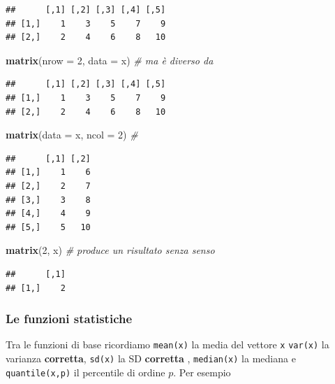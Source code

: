 \documentclass[
  11pt,
]{book}
\newenvironment{Shaded}{\begin{snugshade}}{\end{snugshade}}
\newcommand{\AttributeTok}[1]{\textcolor[rgb]{0.13,0.29,0.53}{#1}}
\newcommand{\CommentTok}[1]{\textcolor[rgb]{0.56,0.35,0.01}{\textit{#1}}}
\newcommand{\DecValTok}[1]{\textcolor[rgb]{0.00,0.00,0.81}{#1}}
\newcommand{\FunctionTok}[1]{\textcolor[rgb]{0.13,0.29,0.53}{\textbf{#1}}}
\newcommand{\NormalTok}[1]{#1}
\theoremstyle{mytheoremstyle}
\theoremstyle{mydefstyle}
\begin{document}
\begin{verbatim}
##      [,1] [,2] [,3] [,4] [,5]
## [1,]    1    3    5    7    9
## [2,]    2    4    6    8   10
\end{verbatim}

\begin{Shaded}
\begin{Highlighting}[]
\FunctionTok{matrix}\NormalTok{(}\AttributeTok{nrow =} \DecValTok{2}\NormalTok{, }\AttributeTok{data =}\NormalTok{ x)  }\CommentTok{\# ma è diverso da}
\end{Highlighting}
\end{Shaded}

\begin{verbatim}
##      [,1] [,2] [,3] [,4] [,5]
## [1,]    1    3    5    7    9
## [2,]    2    4    6    8   10
\end{verbatim}

\begin{Shaded}
\begin{Highlighting}[]
\FunctionTok{matrix}\NormalTok{(}\AttributeTok{data =}\NormalTok{ x, }\AttributeTok{ncol =} \DecValTok{2}\NormalTok{)  }\CommentTok{\#}
\end{Highlighting}
\end{Shaded}

\begin{verbatim}
##      [,1] [,2]
## [1,]    1    6
## [2,]    2    7
## [3,]    3    8
## [4,]    4    9
## [5,]    5   10
\end{verbatim}

\begin{Shaded}
\begin{Highlighting}[]
\FunctionTok{matrix}\NormalTok{(}\DecValTok{2}\NormalTok{, x)                }\CommentTok{\# produce un risultato senza senso}
\end{Highlighting}
\end{Shaded}

\begin{verbatim}
##      [,1]
## [1,]    2
\end{verbatim}

\subsubsection{Le funzioni statistiche}\label{le-funzioni-statistiche}

Tra le funzioni di base ricordiamo \texttt{mean(x)} la media del vettore \texttt{x}
\texttt{var(x)} la varianza \textbf{corretta}, \texttt{sd(x)} la SD \textbf{corretta} , \texttt{median(x)} la mediana
e \texttt{quantile(x,p)} il percentile di ordine \(p\). Per esempio
\end{document}
